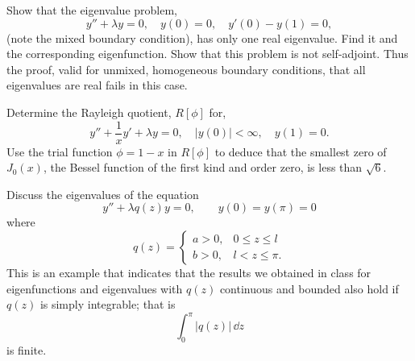 {%
\begin{Exercise}
  \label{exercise y''+ly=0 y'-y=0}
  Show that the eigenvalue problem,
  \[
  y'' + \lambda y = 0, \quad y(0) = 0, \quad y'(0) - y(1) = 0,
  \]
  (note the mixed boundary condition), has only one real eigenvalue.  
  Find it and the corresponding eigenfunction.  
  Show that this problem is not self-adjoint.  Thus the proof,
  valid for unmixed, homogeneous boundary conditions, that all eigenvalues 
  are real fails in this case.

\end{Exercise}









\begin{Exercise}
  \label{exercise y''+1xy'+ly=0}
  Determine the Rayleigh quotient, $R[\phi]$ for,
  \[
  y'' + \frac{1}{x} y' + \lambda y = 0, \quad
  |y(0)| < \infty, \quad y(1) = 0.
  \]
  Use the trial function $\phi = 1-x$ in $R[\phi]$ to deduce that the smallest
  zero of $J_0(x)$, the Bessel function of the first kind and order zero,
  is less than $\sqrt{6}$.

\end{Exercise}










\begin{Exercise}
  \label{exercise y''+lqy=0}
  Discuss the eigenvalues of the equation
  \[
  y'' + \lambda q(z) y = 0, \qquad y(0) = y(\pi) = 0
  \]
  where 
  \[
  q(z) = \begin{cases}
    a>0, & 0 \leq z \leq l \\
    b>0, & l < z \leq \pi.
  \end{cases}
  \]
  This is an example that indicates that the results we obtained in class for
  eigenfunctions and eigenvalues with $q(z)$ continuous and bounded also 
  hold if $q(z)$ is simply integrable; that is
  \[
  \int_0^\pi |q(z)| \,\dd z
  \]
  is finite.

\end{Exercise}






}
